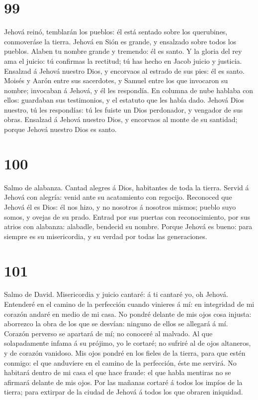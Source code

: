 \hypertarget{section-98}{%
\section{99}\label{section-98}}

 Jehová reinó, temblarán los pueblos: él está sentado
sobre los querubines, conmoveráse la tierra.  Jehová en
Sión es grande, y ensalzado sobre todos los pueblos. 
Alaben tu nombre grande y tremendo: él es santo.  Y la
gloria del rey ama el juicio: tú confirmas la rectitud; tú has hecho en
Jacob juicio y justicia.  Ensalzad á Jehová nuestro Dios,
y encorvaos al estrado de sus pies: él es santo.  Moisés y
Aarón entre sus sacerdotes, y Samuel entre los que invocaron su nombre;
invocaban á Jehová, y él les respondía.  En columna de
nube hablaba con ellos: guardaban sus testimonios, y el estatuto que les
había dado.  Jehová Dios nuestro, tú les respondías: tú
les fuiste un Dios perdonador, y vengador de sus obras. 
Ensalzad á Jehová nuestro Dios, y encorvaos al monte de su santidad;
porque Jehová nuestro Dios es santo.

\hypertarget{section-99}{%
\section{100}\label{section-99}}

 Salmo de alabanza. Cantad alegres á Dios, habitantes de
toda la tierra.  Servid á Jehová con alegría: venid ante
su acatamiento con regocijo.  Reconoced que Jehová él es
Dios: él nos hizo, y no nosotros á nosotros mismos; pueblo suyo somos, y
ovejas de su prado.  Entrad por sus puertas con
reconocimiento, por sus atrios con alabanza: alabadle, bendecid su
nombre.  Porque Jehová es bueno: para siempre es su
misericordia, y su verdad por todas las generaciones.

\hypertarget{section-100}{%
\section{101}\label{section-100}}

 Salmo de David. Misericordia y juicio cantaré: á ti
cantaré yo, oh Jehová.  Entenderé en el camino de la
perfección cuando vinieres á mí: en integridad de mi corazón andaré en
medio de mi casa.  No pondré delante de mis ojos cosa
injusta: aborrezco la obra de los que se desvían: ninguno de ellos se
allegará á mí.  Corazón perverso se apartará de mí; no
conoceré al malvado.  Al que solapadamente infama á su
prójimo, yo le cortaré; no sufriré al de ojos altaneros, y de corazón
vanidoso.  Mis ojos pondré en los fieles de la tierra,
para que estén conmigo: el que anduviere en el camino de la perfección,
éste me servirá.  No habitará dentro de mi casa el que
hace fraude: el que habla mentiras no se afirmará delante de mis ojos.
 Por las mañanas cortaré á todos los impíos de la tierra;
para extirpar de la ciudad de Jehová á todos los que obraren iniquidad.

